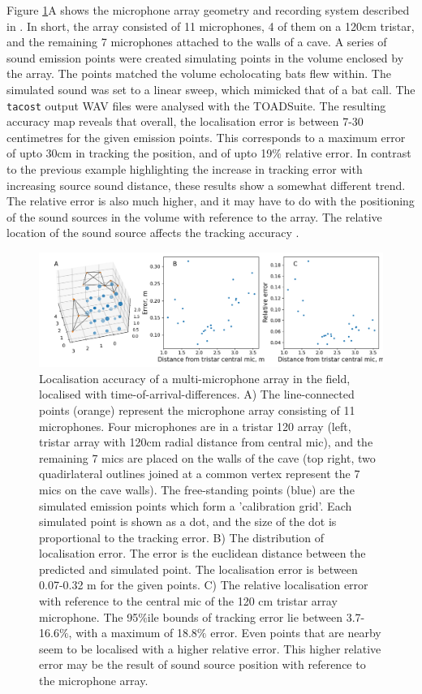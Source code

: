 \documentclass[
]{book}
\begin{document}
Figure \ref{tacostfig2}A shows the microphone array geometry and recording system described in \citep{sfs_cotdoa}. In short, the array consisted of 11 microphones, 4 of them on a 120cm tristar, and the remaining 7 microphones attached to the walls of a cave. A series of sound emission points were created simulating points in the volume enclosed by the array. The points matched the volume echolocating bats flew within. The simulated sound was set to a linear sweep, which mimicked that of a bat call. The \texttt{tacost} output WAV files were analysed with the TOADSuite. The resulting accuracy map reveals that overall, the localisation error is between 7-30 centimetres for the given emission points. This corresponds to a maximum error of upto 30cm in tracking the position, and of upto 19\(\%\) relative error. In contrast to the previous example highlighting the increase in tracking error with increasing source sound distance, these results show a somewhat different trend. The relative error is also much higher, and it may have to do with the positioning of the sound sources in the volume with reference to the array. The relative location of the sound source affects the tracking accuracy \citep{aubauer1994dreidimensionale}.

\begin{figure}
\includegraphics[width=1.0\columnwidth]{original_papers/tacost/data_for_figures/analysis/fig2_points_and_error.png}
\centering
\caption{Localisation accuracy of a multi-microphone array in the field, localised with time-of-arrival-differences. A) The line-connected points (orange) represent the microphone array consisting of 11 microphones. Four microphones are in a tristar 120 array (left, tristar array with 120cm radial distance from central mic), and 
the remaining 7 mics are placed on the walls of the cave (top right, two quadirlateral outlines joined at a common vertex represent the 7 mics on the cave walls). The free-standing points (blue) are  the simulated emission points which form a 'calibration grid'. Each simulated point is shown as a dot, and the size of the dot is proportional to the tracking error. B) The distribution of localisation error. The error is 
the euclidean distance between the predicted and simulated point. The localisation error is between 0.07-0.32 m for the given points. C) The relative localisation error with reference to the central mic of the 120 cm tristar array microphone. The 95$\%$ile bounds of tracking error lie between 3.7-16.6$\%$, with a maximum of 18.8$\%$ error. Even points that are nearby seem to be localised with a higher relative error. This higher relative error may be the result of sound source position with reference to the microphone array.}
\label{tacostfig2}
\end{figure}
\end{document}
